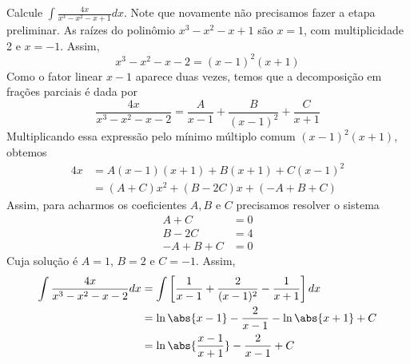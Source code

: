 \begin{example}
  Calcule \(\int \frac{4x}{x^3-x^2-x+1}dx\).
  \solution
  Note que novamente não precisamos fazer a etapa preliminar.
  As raízes do polinômio $x^3-x^2-x+1$ são $x=1$,
  com multiplicidade 2 e $x=-1$. Assim,
  \[
    x^3-x^2-x-2=(x-1)^2(x+1)
  \]
  Como o fator linear $x-1$ aparece duas vezes, temos que a decomposição
  em frações parciais é dada por
  \[
    \frac{4x}{x^3-x^2-x-2}
    = \frac{A}{x-1}
    + \frac{B}{(x-1)^2}
    + \frac{C}{x+1}
  \]
  Multiplicando essa expressão pelo mínimo múltiplo comum $(x-1)^2(x+1)$, obtemos
  \begin{align*}
    4x & = A(x-1)(x+1)+B(x+1)+C(x-1)^2 \\
       & = (A+C)x^2+(B-2C)x+(-A+B+C)
  \end{align*}
  Assim, para acharmos os coeficientes $A,B$ e $C$ precisamos resolver o sistema
  \begin{align*}
    A+C    & = 0 \\
    B-2C   & = 4 \\
    -A+B+C & = 0
  \end{align*}
  Cuja solução é $A=1$, $B=2$ e $C=-1$. Assim,
  \begin{align*}
    \int \frac{4x}{x^3-x^2-x-2}dx
    & = \int \left[ \frac{1}{x-1}+ \frac{2}{(x-1)^2}-\frac{1}{x+1} \right] dx \\
    & = \ln \abs{x-1}- \frac{2}{x-1}- \ln\abs{x+1}+C \\
    & = \ln \abs{\frac{x-1}{x+1}} - \frac{2}{x-1}+C
  \end{align*}
\end{example}


